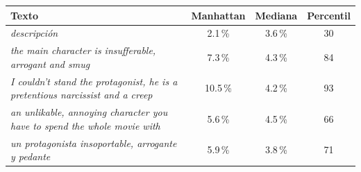 \begin{tabular}{>{\raggedright\arraybackslash}p{7.2cm}ccc}
\toprule
Texto & Manhattan & Mediana & Percentil \\
\midrule
\emph{descripción} & 2.1\,\% & 3.6\,\% & 30 \\
\emph{the main character is insufferable, arrogant and smug} & 7.3\,\% & 4.3\,\% & 84 \\
\emph{I couldn't stand the protagonist, he is a pretentious narcissist and a creep} & 10.5\,\% & 4.2\,\% & 93 \\
\emph{an unlikable, annoying character you have to spend the whole movie with} & 5.6\,\% & 4.5\,\% & 66 \\
\emph{un protagonista insoportable, arrogante y pedante} & 5.9\,\% & 3.8\,\% & 71 \\
\bottomrule
\end{tabular}
